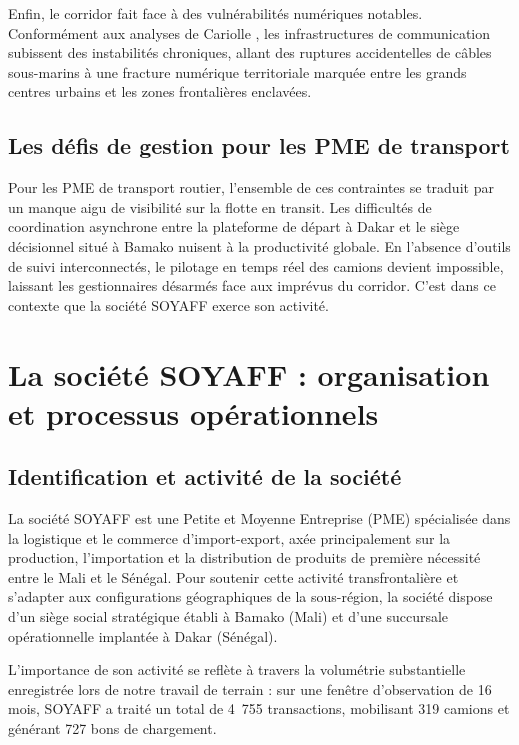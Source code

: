 Enfin, le corridor fait face à des vulnérabilités numériques notables. Conformément aux analyses de Cariolle \cite{cariolleInfrastructuresEconomieNumeriques2018}, les infrastructures de communication subissent des instabilités chroniques, allant des ruptures accidentelles de câbles sous-marins à une fracture numérique territoriale marquée entre les grands centres urbains et les zones frontalières enclavées.

\subsection{Les défis de gestion pour les PME de transport}
Pour les PME de transport routier, l'ensemble de ces contraintes se traduit par un manque aigu de visibilité sur la flotte en transit. Les difficultés de coordination asynchrone entre la plateforme de départ à Dakar et le siège décisionnel situé à Bamako nuisent à la productivité globale. En l’absence d'outils de suivi interconnectés, le pilotage en temps réel des camions devient impossible, laissant les gestionnaires désarmés face aux imprévus du corridor. C'est dans ce contexte que la société SOYAFF exerce son activité.

\section{La société SOYAFF : organisation et processus opérationnels}
\label{sec:soyaff_orga}

\subsection{Identification et activité de la société}
La société SOYAFF est une Petite et Moyenne Entreprise (PME) spécialisée dans la logistique et le commerce d'import-export, axée principalement sur la production, l'importation et la distribution de produits de première nécessité entre le Mali et le Sénégal. Pour soutenir cette activité transfrontalière et s'adapter aux configurations géographiques de la sous-région, la société dispose d'un siège social stratégique établi à Bamako (Mali) et d'une succursale opérationnelle implantée à Dakar (Sénégal). 

L'importance de son activité se reflète à travers la volumétrie substantielle enregistrée lors de notre travail de terrain : sur une fenêtre d'observation de 16 mois, SOYAFF a traité un total de 4~755 transactions, mobilisant 319 camions et générant 727 bons de chargement.

